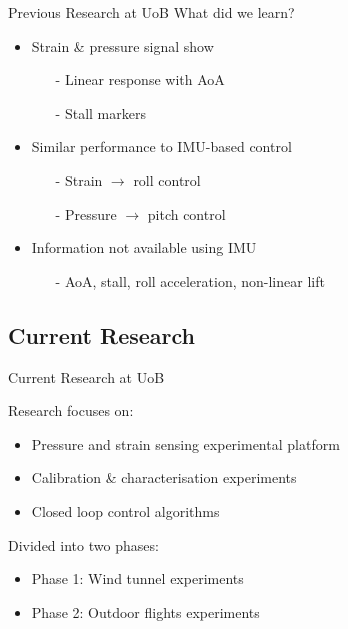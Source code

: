 \documentclass[aspectratio=169]{beamer}            %
\begin{document}
\begin{frame}{Previous Research at UoB}
  What did we learn?
	\pause
    \begin{itemize}[<+->]
      \item Strain \& pressure signal show
			\begin{itemize}[<+->]
			  \item[-]Linear response with AoA
			  \item[-]Stall markers
			\end{itemize}
			\item Similar performance to IMU-based control
			\begin{itemize}[<+->]
			  \item[-]Strain ${\rightarrow}$ roll control
        \item[-]Pressure ${\rightarrow}$ pitch control
			\end{itemize}
			\item Information not available using IMU
			\begin{itemize}[<+->]
			  \item[-]AoA, stall, roll acceleration, non-linear lift
			\end{itemize}
    \end{itemize}
\end{frame}

\subsection[Current Research]{Current Research}

\begin{frame}{Current Research at UoB}

  Research focuses on:
  \pause
	\begin{itemize}[<+->]
    \item Pressure and strain sensing experimental platform
    \item Calibration \& characterisation experiments
    \item Closed loop control algorithms
  \end{itemize}
	\pause
  Divided into two phases:
	\pause
  \begin{itemize}[<+->]
    \item Phase 1: Wind tunnel experiments
    \item Phase 2: Outdoor flights experiments
  \end{itemize}
  
\end{frame}
\end{document}
